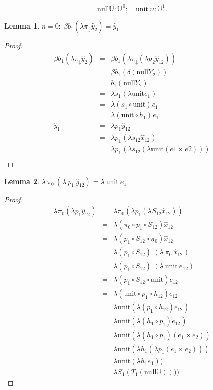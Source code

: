 \documentclass[12pt,a4paper]{article}
\newtheorem*{lemma*}{Lemma}
\theoremstyle{remark}
\newcommand{\pure}{\delta}
\newcommand{\bind}{\beta}
\newcommand{\lift}{\lambda}
\newcommand{\U}{\mathbb{U}}
\newcommand{\hx}{\hat{x}}
\newcommand{\hy}{\hat{y}}
\newcommand{\nullW}{\mathrm{null}}
\newcommand{\unitW}{\mathrm{unit}}
\begin{document}
\[ \nullW\U:\U^0; \quad \unitW\ u : \U^1 . \]

\newpage

\newcommand{\my}[1]{\hat{y}_{#1}}
\renewcommand{\b}[1]{b_{#1}}
\newcommand{\restrprec}{\pi_{\downarrow}}

\begin{lemma*}
$n=0:\ \bind \b1 (\lift \restrprec \my2) = \my1$
\end{lemma*}
\begin{proof}
\begin{eqnarray*}
\bind b_1 (\lift \restrprec \hy_2)
  &=& \bind b_1 ( \lift \restrprec (\lift p_2 \hy_{12}) ) \\
  &=& \bind b_1 ( \pure (\nullW {Y_2}) ) \\
  &=& b_1 (\nullW {Y_2}) \\
  &=& \lift s_1 (\lift \unitW e_1) \\
  &=& \lift (s_1 \circ \unitW) e_1 \\
  &=& \lift (\unitW \circ h_1) e_1 \\
\hy_1
  &=& \lift p_1 \hy_{12} \\
  &=& \lift p_1 (\lift s_{12} \hx_{12}) \\
  &=& \lift p_1 (\lift s_{12} (\lift \unitW (e1 \times e2))) \\
%
\end{eqnarray*}
\end{proof}

\newpage

\begin{lemma*}
$\lift\ \pi_0\ (\lift\ p_1\ \hy_{12}) = \lift\ \unitW\ e_1$.
\end{lemma*}
\begin{proof}
\begin{eqnarray*}
\lift \pi_0 (\lift p_1 \hy_{12})
  &=& \lift \pi_0 (\lift p_1 (\lift S_{12} \hx_{12})) \\
  &=& \lift (\pi_0 \circ p_1 \circ S_{12}) \hx_{12} \\
  &=& \lift (p_1 \circ S_{12} \circ \pi_0) \hx_{12} \\
  &=& \lift (p_1 \circ S_{12})\ (\lift\ \pi_0\ \hx_{12}) \\
  &=& \lift (p_1 \circ S_{12})\ (\lift\ \unitW\ e_{12}) \\
  &=& \lift (p_1 \circ S_{12}\circ\unitW) e_{12} \\
  &=& \lift (\unitW \circ p_1 \circ h_{12}) e_{12} \\
  &=& \lift \unitW (\lift (p_1 \circ h_{12}) e_{12}) \\
  &=& \lift \unitW (\lift (h_1 \circ p_1) e_{12}) \\
  &=& \lift \unitW (\lift (h_1 \circ p_1) (e_1\times e_2)) \\
  &=& \lift \unitW (\lift h_1 (\lift p_1 (e_1\times e_2))) \\
  &=& \lift \unitW (\lift h_1 e_1)) \\
  &=& \lift S_1 (T_1 (\nullW\U))))
\end{eqnarray*}
\end{proof}
\end{document}
